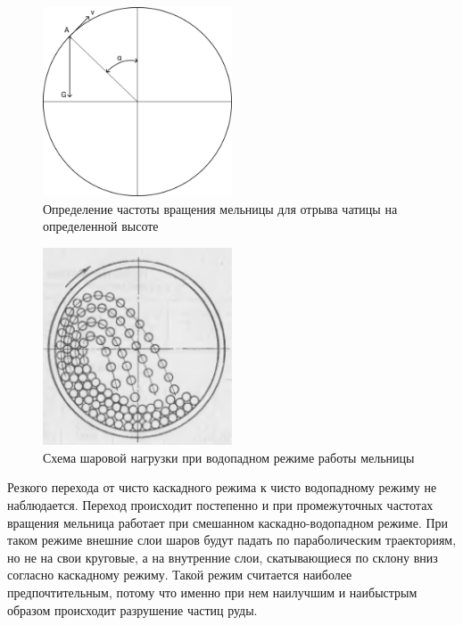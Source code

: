 \documentclass[utf8x, 14pt, oneside, a4paper]{article}
\begin{document}
\begin{figure}[H]
	\centering
	\includegraphics[width=0.5\textwidth]{mill} 
	\caption{Определение частоты вращения мельницы для отрыва чатицы на определенной высоте}
	\label{pic:mill_proec}
\end{figure} 

\begin{figure}[H]
	\centering
	\includegraphics[width=0.5\textwidth]{vodopad_theory} 
	\caption{Схема шаровой нагрузки при водопадном режиме работы мельницы}
	\label{pic:vodopad_theory}
\end{figure} 

Резкого перехода от чисто каскадного режима к чисто водопадному режиму не наблюдается.
Переход происходит постепенно и при промежуточных частотах вращения мельница работает при смешанном каскадно-водопадном режиме.
При таком режиме внешние слои шаров будут падать по параболическим траекториям, но не на свои круговые, а на внутренние слои, скатывающиеся по склону вниз согласно каскадному режиму.
Такой режим считается наиболее предпочтительным, потому что именно при нем наилучшим и наибыстрым образом происходит разрушение частиц руды.
\end{document}
